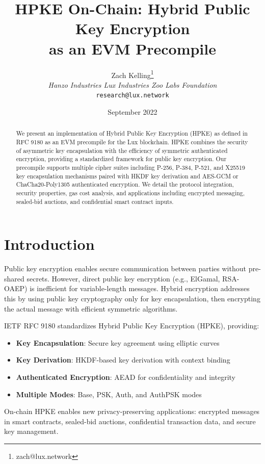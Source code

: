 \documentclass[11pt,a4paper]{article}
\title{\textbf{HPKE On-Chain: Hybrid Public Key Encryption \\as an EVM Precompile}}
\author{Zach Kelling\thanks{zach@lux.network} \\ \textit{Hanzo Industries \quad Lux Industries \quad Zoo Labs Foundation} \\ \texttt{research@lux.network}}
\date{September 2022}
\theoremstyle{definition}
\begin{document}
\maketitle

\begin{abstract}
We present an implementation of Hybrid Public Key Encryption (HPKE) as defined in RFC 9180 as an EVM precompile for the Lux blockchain. HPKE combines the security of asymmetric key encapsulation with the efficiency of symmetric authenticated encryption, providing a standardized framework for public key encryption. Our precompile supports multiple cipher suites including P-256, P-384, P-521, and X25519 key encapsulation mechanisms paired with HKDF key derivation and AES-GCM or ChaCha20-Poly1305 authenticated encryption. We detail the protocol integration, security properties, gas cost analysis, and applications including encrypted messaging, sealed-bid auctions, and confidential smart contract inputs.
\end{abstract}

\section{Introduction}

Public key encryption enables secure communication between parties without pre-shared secrets. However, direct public key encryption (e.g., ElGamal, RSA-OAEP) is inefficient for variable-length messages. Hybrid encryption addresses this by using public key cryptography only for key encapsulation, then encrypting the actual message with efficient symmetric algorithms.

IETF RFC 9180 standardizes Hybrid Public Key Encryption (HPKE), providing:

\begin{itemize}
\item \textbf{Key Encapsulation}: Secure key agreement using elliptic curves
\item \textbf{Key Derivation}: HKDF-based key derivation with context binding
\item \textbf{Authenticated Encryption}: AEAD for confidentiality and integrity
\item \textbf{Multiple Modes}: Base, PSK, Auth, and AuthPSK modes
\end{itemize}

On-chain HPKE enables new privacy-preserving applications: encrypted messages in smart contracts, sealed-bid auctions, confidential transaction data, and secure key management.
\end{document}
